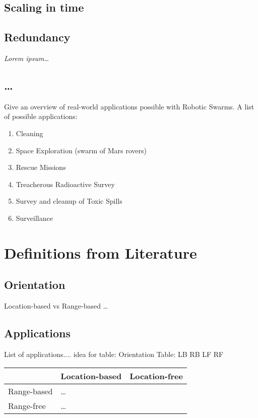 \documentclass[a4paper]{article}
\begin{document}
  \subsection{Scaling in time}
  \subsection{Redundancy}
  
  \emph{Lorem ipsum\ldots}


  \subsection{\ldots}
  Give an overview of real-world applications possible with Robotic Swarms. A list of possible applications:
  \begin{enumerate}
    \item Cleaning
    \item Space Exploration (swarm of Mars rovers)
    \item Rescue Missions
    \item Treacherous Radioactive Survey
    \item Survey and cleanup of Toxic Spills
    \item Surveillance
  \end{enumerate}

\section{Definitions from Literature}

  \subsection{Orientation}
  Location-based vs Range-based \ldots
  \subsection{Applications}
  List of applications.... idea for table: Orientation Table: LB RB LF RF\\
  
  \begin{tabular}{|p{3cm}|p{3cm}|p{3cm}|}
    \hline
     & Location-based & Location-free\\\hline
    Range-based & \ldots & \\\hline
    Range-free & \ldots & \\
    \hline
  \end{tabular}
  
\end{document}
